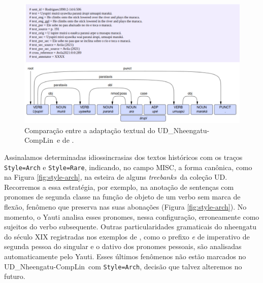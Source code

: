 \documentclass[portuguese]{textolivre}
\newcommand{\udc}{coleção UD}
\newcommand{\tbc}{UD\_Nheengatu-CompLin}
\newcommand{\tbs}{\textit{treebanks}}
\begin{document}
\begin{figure}[htbp]
  \centering
  \begin{minipage}{.75\textwidth}
    \includegraphics[width=\linewidth]{figures/rodrigues-avila.pdf}
    \caption{Comparação entre a adaptação textual do \tbc~e de \textcite{avila2021}.}
    \label{fig:rodrigues-avila}
  \end{minipage}
\end{figure}

Assinalamos determinadas idiossincrasias dos textos históricos com os traços \texttt{Style=\allowbreak Arch} e \texttt{Style=\allowbreak Rare}, indicando, no campo MISC, a forma canônica, como na Figura \ref{fig:style-arch}, na esteira de alguns \tbs~da \udc. Recorremos a essa estratégia, por exemplo, na anotação de sentenças com pronomes de segunda classe na função de objeto de um verbo sem marca de flexão, fenômeno que \textcite{avila2021} preserva nas suas abonações (Figura \ref{fig:style-arch}). No momento, o Yauti analisa esses pronomes, nessa configuração, erroneamente como sujeitos do verbo subsequente. Outras particularidades gramaticais do nheengatu do século XIX registradas nos exemplos de \textcite{avila2021}, como o prefixo \textit{e} de imperativo de segunda pessoa do singular e o dativo dos pronomes pessoais, são analisadas automaticamente pelo Yauti. Esses últimos fenômenos não estão marcados no \tbc~com \texttt{Style=\allowbreak Arch}, decisão que talvez alteremos no futuro.  
\end{document}
